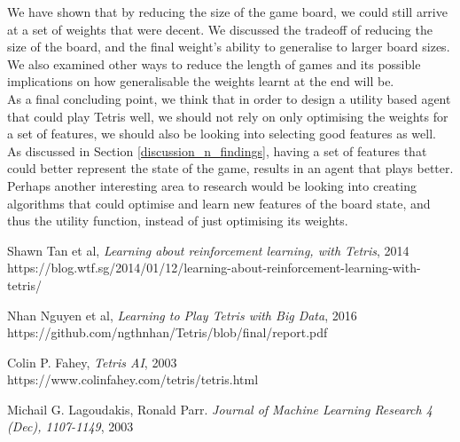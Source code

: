 \documentclass[a4paper,12pt,twocolumn]{article}
\begin{document}
We have shown that by reducing the size of the game board, we could still arrive at
a set of weights that were decent. We discussed the tradeoff of reducing
the size of the board, and the final weight's ability to generalise to larger
board sizes. We also examined other ways to reduce the length of games and its
possible implications on how generalisable the weights learnt at the end will be.\\

As a final concluding point, we think that in order to design a utility based agent
that could play Tetris well, we should not rely on only optimising the weights
for a set of features, we should also be looking into selecting good features as well.
As discussed in Section \ref{discussion_n_findings}, having a set of features that
could better represent the state of the game, results in an agent that plays better.
Perhaps another interesting area to research would be looking into creating algorithms
that could optimise and learn new features of the board state, and thus the utility
function, instead of just optimising its weights.\\

\begin{thebibliography}{9}
    Shawn Tan et al, \textit{Learning about reinforcement learning, with Tetris}, 2014\\https://blog.wtf.sg/2014/01/12/learning-about-reinforcement-learning-with-tetris/

    Nhan Nguyen et al, \textit{Learning to Play Tetris with Big Data}, 2016\\https://github.com/ngthnhan/Tetris/blob/final/report.pdf

    Colin P. Fahey, \textit{Tetris AI}, 2003\\https://www.colinfahey.com/tetris/tetris.html
    
    Michail G. Lagoudakis, Ronald Parr.
    \textit{Journal of Machine Learning Research 4 (Dec), 1107-1149}, 2003
\end{thebibliography}
\end{document}
